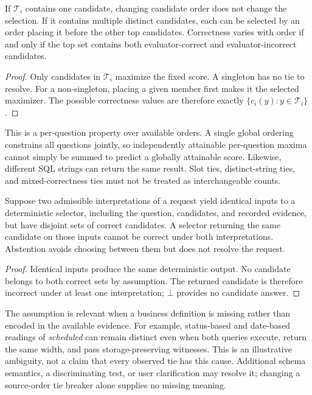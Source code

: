 \documentclass[information,article,submit,moreauthors]{Definitions/mdpi}
\begin{document}
\begin{Proposition}
\label{prop:ties}
If $\mathcal{T}_i$ contains one candidate, changing candidate order does not change the selection. If it contains multiple distinct candidates, each can be selected by an order placing it before the other top candidates. Correctness varies with order if and only if the top set contains both evaluator-correct and evaluator-incorrect candidates.
\end{Proposition}
\begin{proof}
Only candidates in $\mathcal{T}_i$ maximize the fixed score. A singleton has no tie to resolve. For a non-singleton, placing a given member first makes it the selected maximizer. The possible correctness values are therefore exactly $\{c_i(y):y\in\mathcal{T}_i\}$.
\end{proof}

This is a per-question property over available orders. A single global ordering constrains all questions jointly, so independently attainable per-question maxima cannot simply be summed to predict a globally attainable score. Likewise, different SQL strings can return the same result. Slot ties, distinct-string ties, and mixed-correctness ties must not be treated as interchangeable counts.

\begin{Proposition}
\label{prop:indistinguishability}
Suppose two admissible interpretations of a request yield identical inputs to a deterministic selector, including the question, candidates, and recorded evidence, but have disjoint sets of correct candidates. A selector returning the same candidate on those inputs cannot be correct under both interpretations. Abstention avoids choosing between them but does not resolve the request.
\end{Proposition}
\begin{proof}
Identical inputs produce the same deterministic output. No candidate belongs to both correct sets by assumption. The returned candidate is therefore incorrect under at least one interpretation; $\bot$ provides no candidate answer.
\end{proof}

The assumption is relevant when a business definition is missing rather than encoded in the available evidence. For example, status-based and date-based readings of \emph{scheduled} can remain distinct even when both queries execute, return the same width, and pass storage-preserving witnesses. This is an illustrative ambiguity, not a claim that every observed tie has this cause. Additional schema semantics, a discriminating test, or user clarification may resolve it; changing a source-order tie breaker alone supplies no missing meaning.
\end{document}

